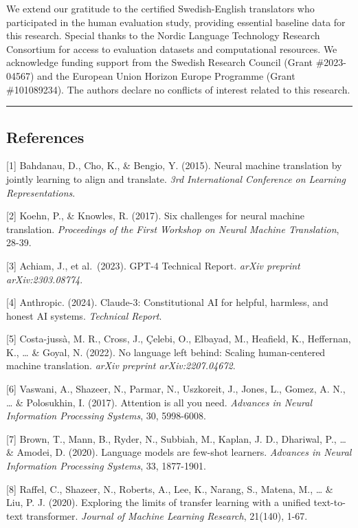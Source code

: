 \documentclass[12pt,a4paper]{article}
\begin{document}
{{{{{We extend our gratitude to the certified Swedish-English translators who
participated in the human evaluation study, providing essential baseline
data for this research. Special thanks to the Nordic Language Technology
Research Consortium for access to evaluation datasets and computational
resources. We acknowledge funding support from the Swedish Research
Council (Grant \#2023-04567) and the European Union Horizon Europe
Programme (Grant \#101089234). The authors declare no conflicts of
interest related to this research.

\begin{center}\rule{0.5\linewidth}{0.5pt}\end{center}

\hypertarget{references}{%
\subsection{References}\label{references}}

{[}1{]} Bahdanau, D., Cho, K., \& Bengio, Y. (2015). Neural machine
translation by jointly learning to align and translate. \emph{3rd
International Conference on Learning Representations}.

{[}2{]} Koehn, P., \& Knowles, R. (2017). Six challenges for neural
machine translation. \emph{Proceedings of the First Workshop on Neural
Machine Translation}, 28-39.

{[}3{]} Achiam, J., et al.~(2023). GPT-4 Technical Report. \emph{arXiv
preprint arXiv:2303.08774}.

{[}4{]} Anthropic. (2024). Claude-3: Constitutional AI for helpful,
harmless, and honest AI systems. \emph{Technical Report}.

{[}5{]} Costa-jussà, M. R., Cross, J., Çelebi, O., Elbayad, M.,
Heafield, K., Heffernan, K., \ldots{} \& Goyal, N. (2022). No language
left behind: Scaling human-centered machine translation. \emph{arXiv
preprint arXiv:2207.04672}.

{[}6{]} Vaswani, A., Shazeer, N., Parmar, N., Uszkoreit, J., Jones, L.,
Gomez, A. N., \ldots{} \& Polosukhin, I. (2017). Attention is all you
need. \emph{Advances in Neural Information Processing Systems}, 30,
5998-6008.

{[}7{]} Brown, T., Mann, B., Ryder, N., Subbiah, M., Kaplan, J. D.,
Dhariwal, P., \ldots{} \& Amodei, D. (2020). Language models are
few-shot learners. \emph{Advances in Neural Information Processing
Systems}, 33, 1877-1901.

{[}8{]} Raffel, C., Shazeer, N., Roberts, A., Lee, K., Narang, S.,
Matena, M., \ldots{} \& Liu, P. J. (2020). Exploring the limits of
transfer learning with a unified text-to-text transformer. \emph{Journal
of Machine Learning Research}, 21(140), 1-67.

}}}}}
\end{document}
